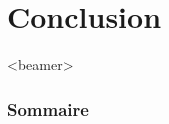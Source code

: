 \documentclass{beamer}
\begin{document}



  


\section{Conclusion}

\begin{frame}<beamer>
  \frametitle{Sommaire}
  \tableofcontents[currentsection]
\end{frame}
\end{document}
